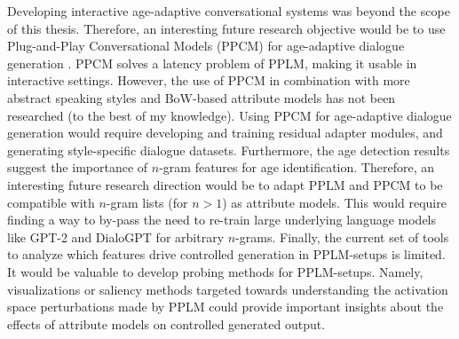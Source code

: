 Developing interactive age-adaptive conversational systems was beyond the scope of this thesis. Therefore, an interesting future research objective would be to use Plug-and-Play Conversational Models (PPCM) for age-adaptive dialogue generation \citep{madotto-etal-2020-plug}. PPCM solves a latency problem of PPLM, making it usable in interactive settings. However, the use of PPCM in combination with more abstract speaking styles and BoW-based attribute models has not been researched (to the best of my knowledge). Using PPCM for age-adaptive dialogue generation would require developing and training residual adapter modules, and generating style-specific dialogue datasets. Furthermore, the age detection results suggest the importance of $n$-gram features for age identification. Therefore, an interesting future research direction would be to adapt PPLM and PPCM to be compatible with $n$-gram lists (for $n>1$) as attribute models. This would require finding a way to by-pass the need to re-train large underlying language models like GPT-2 and DialoGPT for arbitrary $n$-grams. Finally, the current set of tools to analyze which features drive controlled generation in PPLM-setups is limited. It would be valuable to develop probing methods for PPLM-setups. Namely, visualizations or saliency methods targeted towards understanding the activation space perturbations made by PPLM could provide important insights about the effects of attribute models on controlled generated output.

